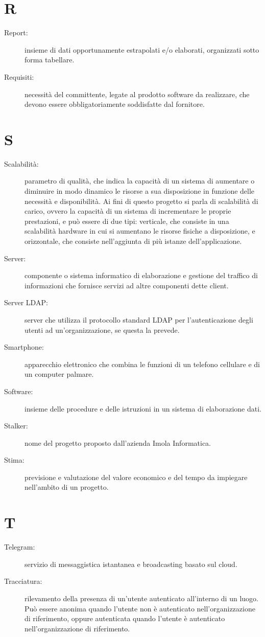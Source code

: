 \documentclass{article}
\begin{document}
	\section{R}
	\begin{description}
		\item[Report:] insieme di dati opportunamente estrapolati e/o elaborati, organizzati sotto forma tabellare.
		\item[Requisiti:] necessità del committente, legate al prodotto software da realizzare, che devono essere obbligatoriamente soddisfatte dal fornitore.
	\end{description}
	\newpage
	\section{S}
	\begin{description}
		\item[Scalabilità:] parametro di qualità, che indica la capacità di un sistema di aumentare o diminuire in modo dinamico le risorse a sua disposizione in funzione delle necessità e disponibilità. Ai fini di questo progetto si parla di scalabilità di carico, ovvero la capacità di un sistema di incrementare le proprie prestazioni, e può essere di due tipi: verticale, che consiste in una scalabilità hardware in cui si aumentano le risorse fisiche a disposizione, e orizzontale, che consiste nell’aggiunta di più istanze dell’applicazione.
		\item[Server:] componente o sistema informatico di elaborazione e gestione del traffico di informazioni che fornisce servizi ad altre componenti dette client.
		\item[Server LDAP:] server che utilizza il protocollo standard LDAP per l'autenticazione degli utenti ad un'organizzazione, se questa la prevede.
		\item[Smartphone:] apparecchio elettronico che combina le funzioni di un telefono cellulare e di un computer palmare.
		\item[Software:] insieme delle procedure e delle istruzioni in un sistema di elaborazione dati.
		\item[Stalker:] nome del progetto proposto dall'azienda Imola Informatica.
		\item[Stima:] previsione e valutazione del valore economico e del tempo da impiegare nell'ambito di un progetto.
	\end{description}
	\newpage
	\section{T}
	\begin{description}
		\item[Telegram:] servizio di messaggistica istantanea e broadcasting basato sul cloud.
		\item[Tracciatura:] rilevamento della presenza di un'utente autenticato all’interno di un luogo. Può essere anonima quando l'utente non è autenticato nell’organizzazione di riferimento, oppure autenticata quando l'utente è autenticato nell’organizzazione di riferimento.
	\end{description}
	\newpage
\end{document}
